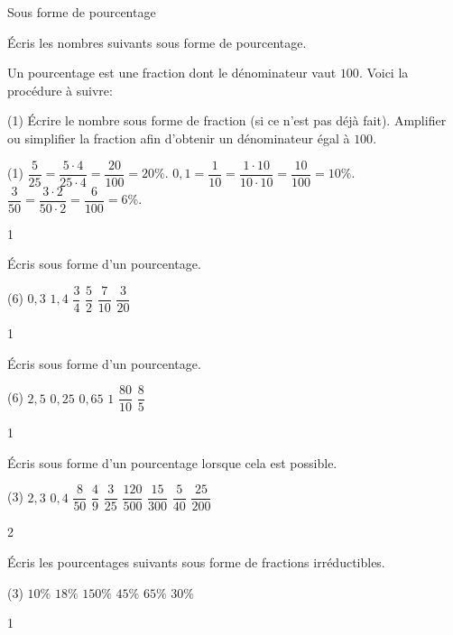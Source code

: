 \documentclass[a4paper,11pt]{report}
\begin{document}
\begin{resolu}{Sous forme de pourcentage}{
	Écris les nombres suivants sous forme de pourcentage.

	{\color{blue} Un pourcentage est une fraction dont le dénominateur vaut $100$. Voici la procédure à suivre:
	\begin{tasks}(1)
		\task[1.] Écrire le nombre sous forme de fraction (si ce n'est pas déjà fait).
		\task[2.] Amplifier ou simplifier la fraction afin d'obtenir un dénominateur égal à $100$. 
\end{tasks}
}
\begin{tasks}(1)
	\task $\dfrac{5}{25}=\dfrac{5\cdot 4}{25\cdot 4}=\dfrac{20}{100}=20\%.$
	\task $0,1=\dfrac{1}{10}=\dfrac{1\cdot 10}{10\cdot 10}=\dfrac{10}{100}=10\%.$
	\task $\dfrac{3}{50}=\dfrac{3\cdot 2}{50\cdot 2}=\dfrac{6}{100}=6\%.$
\end{tasks}}{1}
\end{resolu}

\begin{exo}{
Écris sous forme d'un pourcentage.
	\begin{tasks}(6)
	\task $0,3$
	\task $1,4$
	\task $\dfrac{3}{4}$
	\task $\dfrac{5}{2}$
	\task $\dfrac{7}{10}$
	\task $\dfrac{3}{20}$
	\end{tasks}
 \vspace{1pt}
}{1}\end{exo}

\begin{exo}{
Écris sous forme d'un pourcentage.
	\begin{tasks}(6)
	\task $2,5$
	\task $0,25$
	\task $0,65$
	\task $1$
	\task $\dfrac{80}{10}$
	\task $\dfrac{8}{5}$
	\end{tasks}
 \vspace{1pt}
}{1}\end{exo}

\begin{exo}{
Écris sous forme d'un pourcentage lorsque cela est possible.
\begin{tasks}(3)
\task $2,3$
\task $0,4$
\task $\dfrac{8}{50}$
\task $\dfrac{4}{9}$
\task $\dfrac{3}{25}$
\task $\dfrac{120}{500}$
\task $\dfrac{15}{300}$
\task $\dfrac{5}{40}$
\task $\dfrac{25}{200}$
\end{tasks}
 \vspace{1pt}
}{2}\end{exo}

\begin{exo}{
Écris les pourcentages suivants sous forme de fractions irréductibles.
\begin{tasks}(3)
\task $10\%$
\task $18\%$
\task $150\%$
\task $45\%$
\task $65\%$
\task $30\%$
\end{tasks}
 \vspace{1pt}
}{1}\end{exo}
\end{document}
